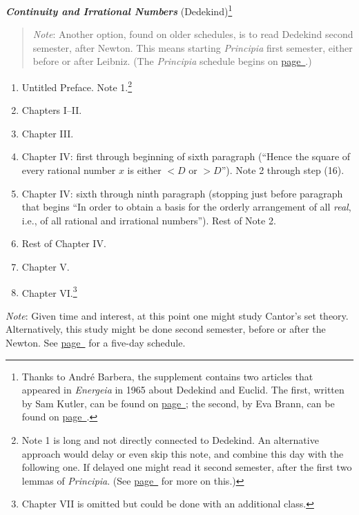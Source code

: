 \documentclass[10pt]{article}
\begin{document}
{\textbf{\emph{Continuity and Irrational Numbers}} (Dedekind)\footnote{Thanks to Andr\'e Barbera, the supplement contains two articles that appeared in \emph{Energeia} in 1965 about Dedekind and Euclid. The first, written by Sam Kutler, can be found on \hyperref[supple.100]{page~\pageref{supple.100}}; the second, by Eva Brann, can be found on \hyperref[supple.102]{page~\pageref{supple.102}}.}
\vspace{-0.7em}
\begin{quote}
\small{\emph{Note}: Another option, found on older schedules, is to read Dedekind second semester, after Newton. This means starting \emph{Principia} first semester, either before or after Leibniz. (The \emph{Principia} schedule begins on \hyperref[NewtonStart]{page~\pageref{NewtonStart}}.)} 
\end{quote}
\begin{enumerate}[resume*]
	\item Untitled Preface. Note 1.\footnote{Note 1 is
			long and not directly connected to
		       Dedekind. An alternative approach
	       would delay or even skip this note, and
	       combine this day with the following one. If
       delayed one might read it second semester, after the
first two lemmas of \emph{Principia}. (See
\hyperref[Dedekind]{page~\pageref{Dedekind}} for more on
	this.)}	       
	\item Chapters I--II.
	\item Chapter III. 
	\item Chapter IV: first through beginning of sixth
		paragraph (``Hence the square of every
		rational number $x$ is either $<D$ or
		$>D$''). Note 2 through step (16).
	\item Chapter IV: sixth through ninth paragraph
		(stopping just before paragraph that begins
		``In order to obtain a basis for the orderly
		arrangement of all \emph{real}, i.e., of all
		rational and irrational numbers''). Rest of
	       Note 2.	
       \item Rest of Chapter IV.
       \item Chapter V.
       \item Chapter VI.\footnote{Chapter VII is omitted but
		       could be done with an additional
		       class.}
\end{enumerate}
{\small \emph{Note}: Given time and interest, at this point one
might study Cantor's set theory. Alternatively, this study
might be done second semester, before or after the Newton.
See \hyperref[Cantor]{page~\pageref{Cantor}} for a five-day 
schedule.}
}
\end{document}
